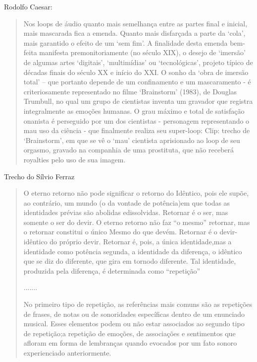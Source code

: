 \documentclass{ppgmus}
\begin{document}
Rodolfo Caesar:

\begin{quotation}
 Nos loops de áudio quanto mais semelhança entre as partes final e inicial, mais mascarada fica a
emenda. Quanto mais disfarçada a parte da ‘cola’, mais garantido o efeito de um ‘sem fim’. A finalidade
desta emenda bem-feita manifesta premonitoriamente (no século XIX), o desejo de ‘imersão’ de algumas
artes ‘digitais’, ‘multimídias’ ou ‘tecnológicas’, projeto típico de décadas finais do século XX e início do
XXI. O sonho da ‘obra de imersão total’ – que portanto depende de um confinamento e um mascaramento -
é criteriosamente representado no filme ‘Brainstorm’ (1983), de Douglas Trumbull, no qual um grupo de
cientistas inventa um gravador que registra integralmente as emoções humanas. O grau máximo e total de
satisfação onanista é perseguido por um dos cientistas - personagem representando o mau uso da ciência -
que finalmente realiza seu super-loop:
Clip: trecho de ‘Brainstorm’, em que se vê o ‘mau’ cientista aprisionado ao loop de seu orgasmo, gravado na
companhia de uma prostituta, que não receberá royalties pelo uso de sua imagem.
\end{quotation} 

Trecho do Sílvio Ferraz
 
\begin{quotation}
 

O eterno retorno não pode significar o retorno do Idêntico, pois ele supõe, 
ao contrário, um mundo (o da vontade de potência)em que todas as identidades 
prévias são abolidas edissolvidas. Retornar é o ser, mas somente o ser do devir. 
O eterno retorno não faz “o mesmo” retornar, mas o retornar constitui o único 
Mesmo do que devém. Retornar é o devir-idêntico do próprio devir. Retornar é, 
pois, a única identidade,mas a identidade como potência segunda, a identidade da 
diferença, o idêntico que se diz do diferente, que gira em tornodo diferente. 
Tal identidade, produzida pela diferença, é determinada como “repetição”

.......

No primeiro tipo de repetição, as referências mais comuns são as repetições de frases, 
de notas ou de sonoridades específicas dentro de um enunciado musical. Esses elementos podem 
ou não estar associados ao segundo tipo de repetição;a repetição de emoções, de associações e 
sentimentos que afloram em forma de lembranças quando evocados por um fato sonoro experienciado 
anteriormente.

\end{quotation}
\end{document}
